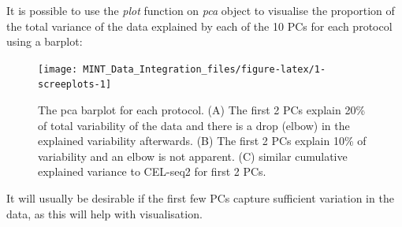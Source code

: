 \documentclass[]{book}
\newenvironment{Shaded}{\begin{snugshade}}{\end{snugshade}}
\newcommand{\CommentTok}[1]{\textcolor[rgb]{0.56,0.35,0.01}{\textit{#1}}}
\newcommand{\DataTypeTok}[1]{\textcolor[rgb]{0.13,0.29,0.53}{#1}}
\newcommand{\DecValTok}[1]{\textcolor[rgb]{0.00,0.00,0.81}{#1}}
\newcommand{\FloatTok}[1]{\textcolor[rgb]{0.00,0.00,0.81}{#1}}
\newcommand{\KeywordTok}[1]{\textcolor[rgb]{0.13,0.29,0.53}{\textbf{#1}}}
\newcommand{\NormalTok}[1]{#1}
\newcommand{\OperatorTok}[1]{\textcolor[rgb]{0.81,0.36,0.00}{\textbf{#1}}}
\newcommand{\StringTok}[1]{\textcolor[rgb]{0.31,0.60,0.02}{#1}}
\theoremstyle{definition}
\theoremstyle{definition}
\theoremstyle{definition}
\theoremstyle{remark}
\begin{document}
It is possible to use the \emph{plot} function on \emph{pca} object to
visualise the proportion of the total variance of the data explained by
each of the 10 PCs for each protocol using a barplot:

\begin{Shaded}
\end{Shaded}

\begin{figure}[ht]

{\centering \texttt{[image: MINT\_Data\_Integration\_files/figure-latex/1-screeplots-1]} 

}

\caption{The pca barplot for each protocol. (A) The first 2 PCs explain 20\% of total variability of the data and there is a drop (elbow) in the explained variability afterwards. (B) The first 2 PCs explain 10\% of variability and an elbow is not apparent. (C) similar cumulative explained variance to CEL-seq2 for first 2 PCs.}\label{fig:1-screeplots}
\end{figure}

It will usually be desirable if the first few PCs capture sufficient
variation in the data, as this will help with visualisation.
\end{document}
